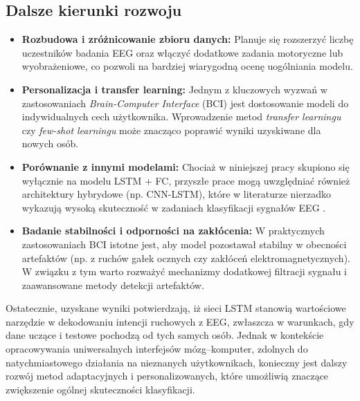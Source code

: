 \documentclass[eeg_v4.tex]{subfiles}
\begin{document}
    \subsection*{Dalsze kierunki rozwoju}
    \begin{itemize}
        \item \textbf{Rozbudowa i zróżnicowanie zbioru danych:}
        Planuje się rozszerzyć liczbę uczestników badania EEG oraz włączyć dodatkowe zadania motoryczne lub
        wyobrażeniowe,
        co pozwoli na bardziej wiarygodną ocenę uogólniania modelu.

        \item \textbf{Personalizacja i transfer learning:}
        Jednym z kluczowych wyzwań w zastosowaniach \textit{Brain-Computer Interface} (BCI) jest dostosowanie modeli
        do indywidualnych cech użytkownika. Wprowadzenie metod \textit{transfer learningu} czy
        \textit{few-shot learningu}
        może znacząco poprawić wyniki uzyskiwane dla nowych osób.

        \item \textbf{Porównanie z innymi modelami:}
        Chociaż w niniejszej pracy skupiono się wyłącznie na modelu LSTM + FC, przyszłe prace mogą uwzględniać również
        architektury hybrydowe (np. CNN-LSTM), które w literaturze nierzadko wykazują wysoką skuteczność w zadaniach
        klasyfikacji sygnałów EEG \cite{boutarfaia2023,roots2020}.

        \item \textbf{Badanie stabilności i odporności na zakłócenia:}
        W praktycznych zastosowaniach BCI istotne jest, aby model pozostawał stabilny w obecności artefaktów (np. z
        ruchów gałek ocznych czy zakłóceń elektromagnetycznych). W związku z tym warto rozważyć mechanizmy dodatkowej
        filtracji sygnału i zaawansowane metody detekcji artefaktów.
    \end{itemize}

    Ostatecznie, uzyskane wyniki potwierdzają, iż sieci LSTM stanowią wartościowe narzędzie w dekodowaniu intencji
    ruchowych
    z EEG, zwłaszcza w warunkach, gdy dane uczące i testowe pochodzą od tych samych osób. Jednak w kontekście
    opracowywania
    uniwersalnych interfejsów mózg–komputer, zdolnych do natychmiastowego działania na nieznanych użytkownikach,
    konieczny
    jest dalszy rozwój metod adaptacyjnych i personalizowanych, które umożliwią znaczące zwiększenie ogólnej
    skuteczności
    klasyfikacji.
\end{document}
